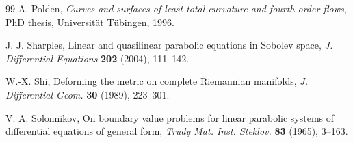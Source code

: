 \documentclass[11pt,reqno]{amsart}
\theoremstyle{definition}
\theoremstyle{remark}
\numberwithin{equation}{section}
\begin{document}
\begin{thebibliography}{99}
 A. Polden, \emph{Curves and surfaces of least total curvature and fourth-order
flows}, PhD thesis, Universit\"at T\"ubingen, 1996.

 J. J. Sharples, Linear and quasilinear parabolic equations in Sobolev space,
\emph{J. Differential Equations} \textbf{202} (2004), 111--142.

 W.-X. Shi, Deforming the metric on complete Riemannian manifolds, \emph{J. Differential
Geom.} \textbf{30} (1989), 223--301.

 V. A. Solonnikov, On boundary value problems for linear parabolic systems of
differential equations of general form, \emph{Trudy Mat. Inst. Steklov.} \textbf{83} (1965), 3--163.

\end{thebibliography}
\end{document}
